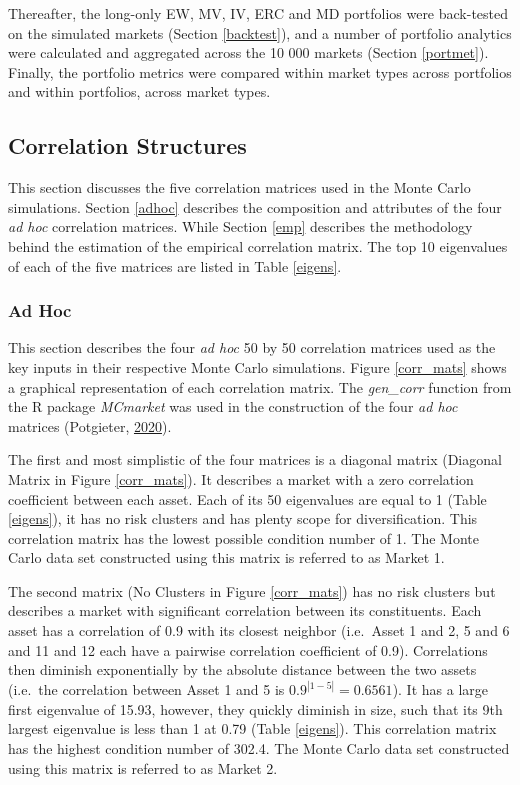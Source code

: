 \documentclass[11pt,preprint, authoryear]{elsarticle}
\numberwithin{equation}{section}
\numberwithin{figure}{section}
\numberwithin{table}{section}
\begin{document}
Thereafter, the long-only EW, MV, IV, ERC and MD portfolios were
back-tested on the simulated markets (Section \ref{backtest}), and a
number of portfolio analytics were calculated and aggregated across the
10 000 markets (Section \ref{portmet}). Finally, the portfolio metrics
were compared within market types across portfolios and within
portfolios, across market types.

\hypertarget{correlation-structures}{%
\subsection{\texorpdfstring{Correlation Structures
\label{corr_struc}}{Correlation Structures }}\label{correlation-structures}}

This section discusses the five correlation matrices used in the Monte
Carlo simulations. Section \ref{adhoc} describes the composition and
attributes of the four \emph{ad hoc} correlation matrices. While Section
\ref{emp} describes the methodology behind the estimation of the
empirical correlation matrix. The top 10 eigenvalues of each of the five
matrices are listed in Table \ref{eigens}.

\hypertarget{ad-hoc}{%
\subsubsection{\texorpdfstring{Ad Hoc
\label{adhoc}}{Ad Hoc }}\label{ad-hoc}}

This section describes the four \emph{ad hoc} 50 by 50 correlation
matrices used as the key inputs in their respective Monte Carlo
simulations. Figure \ref{corr_mats} shows a graphical representation of
each correlation matrix. The \emph{gen\_corr} function from the R
package \emph{MCmarket} was used in the construction of the four
\emph{ad hoc} matrices (Potgieter,
\protect\hyperlink{ref-MCmarket}{2020}).

The first and most simplistic of the four matrices is a diagonal matrix
(Diagonal Matrix in Figure \ref{corr_mats}). It describes a market with
a zero correlation coefficient between each asset. Each of its 50
eigenvalues are equal to 1 (Table \ref{eigens}), it has no risk clusters
and has plenty scope for diversification. This correlation matrix has
the lowest possible condition number of 1. The Monte Carlo data set
constructed using this matrix is referred to as Market 1.

The second matrix (No Clusters in Figure \ref{corr_mats}) has no risk
clusters but describes a market with significant correlation between its
constituents. Each asset has a correlation of 0.9 with its closest
neighbor (i.e.~Asset 1 and 2, 5 and 6 and 11 and 12 each have a pairwise
correlation coefficient of 0.9). Correlations then diminish
exponentially by the absolute distance between the two assets (i.e.~the
correlation between Asset 1 and 5 is \(0.9^{|1-5|}=0.6561\)). It has a
large first eigenvalue of 15.93, however, they quickly diminish in size,
such that its 9th largest eigenvalue is less than 1 at 0.79 (Table
\ref{eigens}). This correlation matrix has the highest condition number
of 302.4. The Monte Carlo data set constructed using this matrix is
referred to as Market 2.
\end{document}
